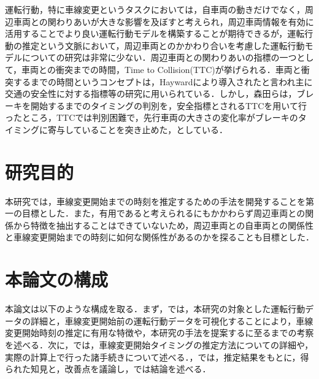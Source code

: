 \par
運転行動，特に車線変更というタスクにおいては，自車両の動きだけでなく，周辺車両との関わりあいが大きな影響を及ぼすと考えられ，周辺車両情報を有効に活用することでより良い運転行動モデルを構築することが期待できるが，運転行動の推定という文脈において，周辺車両とのかかわり合いを考慮した運転行動モデルについての研究は非常に少ない\cite{survey}．周辺車両との関わりあいの指標の一つとして，車両との衝突までの時間，Time to Collision(TTC)が挙げられる．車両と衝突するまでの時間というコンセプトは，Hayward\cite{hayward}により導入されたと言われ主に交通の安全性に対する指標等の研究に用いられている\cite{Minderhoud}．しかし，森田\cite{Morita}らは，ブレーキを開始するまでのタイミングの判別を，安全指標とされるTTCを用いて行ったところ，TTCでは判別困難で，先行車両の大きさの変化率がブレーキのタイミングに寄与していることを突き止めた，としている．
\\
\section{研究目的}
本研究では，車線変更開始までの時刻を推定するための手法を開発することを第一の目標とした．また，有用であると考えられるにもかかわらず周辺車両との関係から特徴を抽出することはできていないため，周辺車両との自車両との関係性と車線変更開始までの時刻に如何な関係性があるのかを探ることも目標とした．
\\
\section{本論文の構成}
本論文は以下のような構成を取る．まず，では，本研究の対象とした運転行動データの詳細と，車線変更開始前の運転行動データを可視化することにより，車線変更開始時刻の推定に有用な特徴や，本研究の手法を提案するに至るまでの考察を述べる．次に，では，車線変更開始タイミングの推定方法についての詳細や，実際の計算上で行った諸手続きについて述べる．，では，推定結果をもとに，得られた知見と，改善点を議論し，では結論を述べる．


